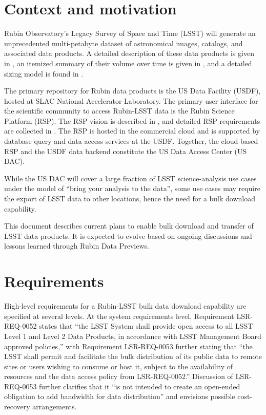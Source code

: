 \section{Context and motivation}

Rubin Observatory's Legacy Survey of Space and Time (LSST) will generate an unprecedented multi-petabyte dataset of astronomical images, catalogs, and associated data products. A detailed description of these data products is given in , an itemized summary of their volume over time is given in , and a detailed sizing model is found in .

The primary repository for Rubin data products is the US Data Facility (USDF), hosted at SLAC National Accelerator Laboratory. The primary user interface for the scientific community to access Rubin-LSST data is the Rubin Science Platform (RSP). The RSP vision is described in , and detailed RSP requirements are collected in . The RSP is hosted in the commercial cloud and is supported by database query and data-access services at the USDF. Together, the cloud-based RSP and the USDF data backend constitute the US Data Access Center (US DAC).

While the US DAC will cover a large fraction of LSST science-analysis use cases under the model of ``bring your analysis to the data'', some use cases may require the export of LSST data to other locations, hence the need for a bulk download capability.

This document describes current plans to enable bulk download and transfer of LSST data products. It is expected to evolve based on ongoing discussions and lessons learned through Rubin Data Previews.

\section{Requirements}

High-level requirements for a Rubin-LSST bulk data download capability are specified at several levels. At the system requirements level,  Requirement LSR-REQ-0052 states that ``the LSST System shall provide open access to all LSST Level 1 and Level 2 Data Products, in accordance with LSST Management Board approved policies,'' with Requirement LSR-REQ-0053 further stating that ``the LSST shall permit and facilitate the bulk distribution of its public data to remote sites or users wishing to consume or host it, subject to the availability of resources and the data access policy from LSR-REQ-0052.'' Discussion of LSR-REQ-0053 further clarifies that it ``is not intended to create an open-ended obligation to add bandwidth for data distribution'' and envisions possible cost-recovery arrangements.

